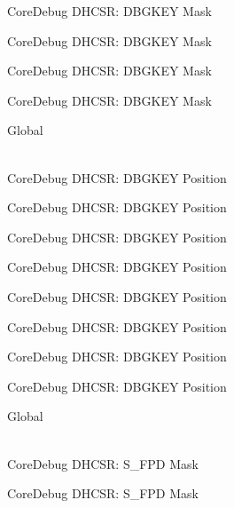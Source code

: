 \begin{DoxyRefList}
\label{deprecated__deprecated000302}%
%
Core\+Debug DHCSR\+: DBGKEY Mask 

\label{deprecated__deprecated000378}%
%
Core\+Debug DHCSR\+: DBGKEY Mask 

\label{deprecated__deprecated000457}%
%
Core\+Debug DHCSR\+: DBGKEY Mask 

\label{deprecated__deprecated000559}%
%
Core\+Debug DHCSR\+: DBGKEY Mask  
\item[{\parbox[t]{\linewidth}{Global \doxylink{group___c_m_s_i_s___core_debug_gac91280edd0ce932665cf75a23d11d842}{Core\+Debug\+\_\+\+DHCSR\+\_\+\+DBGKEY\+\_\+\+Pos} }}]\hfill \\
\label{deprecated__deprecated000005}%
%
Core\+Debug DHCSR\+: DBGKEY Position 

\label{deprecated__deprecated000105}%
%
Core\+Debug DHCSR\+: DBGKEY Position 

\label{deprecated__deprecated000159}%
%
Core\+Debug DHCSR\+: DBGKEY Position 

\label{deprecated__deprecated000244}%
%
Core\+Debug DHCSR\+: DBGKEY Position 

\label{deprecated__deprecated000301}%
%
Core\+Debug DHCSR\+: DBGKEY Position 

\label{deprecated__deprecated000377}%
%
Core\+Debug DHCSR\+: DBGKEY Position 

\label{deprecated__deprecated000456}%
%
Core\+Debug DHCSR\+: DBGKEY Position 

\label{deprecated__deprecated000558}%
%
Core\+Debug DHCSR\+: DBGKEY Position  
\item[{\parbox[t]{\linewidth}{Global \doxylink{group___c_m_s_i_s___s_c_b_gae37ad624177fe2d3298fd32d528805aa}{Core\+Debug\+\_\+\+DHCSR\+\_\+\+S\+\_\+\+FPD\+\_\+\+Msk} }}]\hfill \\
\label{deprecated__deprecated000014}%
%
Core\+Debug DHCSR\+: S\+\_\+\+FPD Mask 

\label{deprecated__deprecated000465}%
%
Core\+Debug DHCSR\+: S\+\_\+\+FPD Mask 


\end{DoxyRefList}
